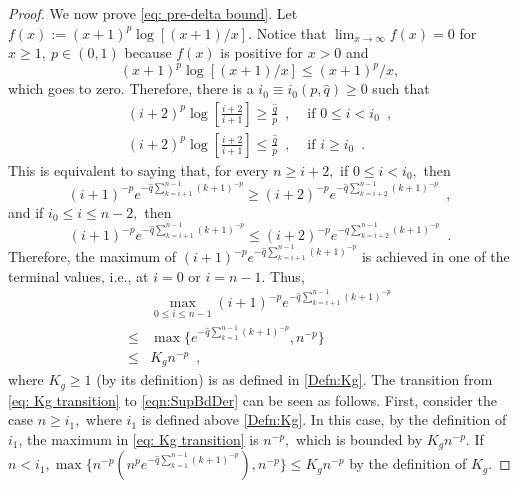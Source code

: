 \documentclass[usenames,dvipsnames,final,12pt]{colt2018} %
\newcommand{\gugan}[1]{#1}
\begin{document}
\begin{proof}
	
	We now prove \eqref{eq: pre-delta bound}.
	Let $f(x) := (x + 1)^p \log[(x+ 1)/x].$ Notice that $ \lim_{x\rightarrow \infty} f(x) = 0$ for $x\geq 1,~p\in(0,1)$ because $f(x)$ is positive for $x>0$ and $$(x + 1)^p \log[(x+ 1)/x] \leq (x + 1)^p/x,$$ which goes to zero.	
	\gugan{Therefore, there is a $i_0 \equiv i_0(p, \hat{q}) \geq 0$  such that
		\begin{eqnarray*}
			(i+ 2)^p \log\left[\frac{i + 2}{i + 1}\right] \geq \frac{\hat{q}}{p} \enspace, & \text{ if $0 \leq i < i_0 \enspace,$}\\
			(i + 2)^p \log\left[\frac{i + 2}{i + 1}\right] \leq \frac{\hat{q}}{p} \enspace, & \text{ if $i \geq i_0$} \enspace.
		\end{eqnarray*}
		This is equivalent to saying that, for every $n \geq i + 2,$ if $0 \leq i < i_0,$ then
		\[
		(i + 1)^{-p} e^{-\hat{q} \sum_{k = i + 1}^{n - 1}(k + 1)^{-p}} \geq (i + 2)^{-p} e^{-\hat{q} \sum_{k = i + 2}^{n - 1}(k + 1)^{-p}}\enspace,
		\]
		and if $i_0 \leq i \leq n - 2,$ then
		\[
		(i + 1)^{-p} e^{-\hat{q} \sum_{k = i + 1}^{n - 1}(k + 1)^{-p}} \leq (i + 2)^{-p} e^{-\hat{q} \sum_{k = i + 2}^{n - 1}(k + 1)^{-p}}\enspace.
		\]
		Therefore, the maximum of $(i + 1)^{-p} e^{-\hat{q} \sum_{k = i + 1}^{n - 1} (k + 1)^{-p}}$ is achieved in one of the terminal values, i.e., at $i=0$ or $i=n-1.$ Thus,
		\begin{align}
		&\max_{0 \leq i \leq n - 1} (i + 1)^{-p} e^{-\hat{q} \sum_{k = i + 1}^{n - 1} (k + 1)^{-p}} \nonumber\\
		\leq&  \max\{e^{-\hat{q}\sum_{k = 1}^{n - 1} (k + 1)^{-p}}, n^{-p} \} \label{eq: Kg transition} \\
		\leq & K_g n^{-p} \enspace, \label{eqn:SupBdDer}
		\end{align}
		\sloppy
		where $K_g \geq 1$ (by its definition) is as defined in \eqref{Defn:Kg}.} The transition from \eqref{eq: Kg transition} to \eqref{eqn:SupBdDer} can be seen as follows. First, consider the case  $n\geq i_1,$ where $i_1$ is defined above \eqref{Defn:Kg}. In this case, by the definition of $i_1$, the maximum in \eqref{eq: Kg transition} is $n^{-p},$ which is bounded by $K_g n^{-p}.$  If ${n< i_1, \max\{n^{-p} \left( n^p e^{-\hat{q}\sum_{k = 1}^{n - 1} (k + 1)^{-p}}\right), n^{-p} \} \leq K_g n^{-p}}$ by the definition of $K_g.$
	

\end{proof}
\end{document}
